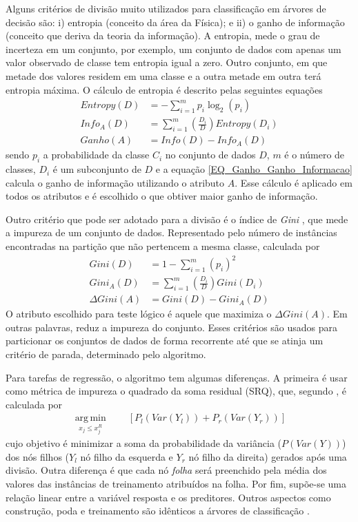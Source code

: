 Alguns critérios de divisão muito utilizados para classificação em árvores de decisão são: i) entropia (conceito da área da Física); e ii) o ganho de informação  (conceito que deriva da teoria da informação). A entropia, mede o grau de incerteza em um conjunto, por exemplo, um conjunto de dados com apenas um valor observado de classe tem entropia igual a zero. Outro conjunto, em que metade dos valores residem em uma classe e a outra metade em outra terá entropia máxima. O cálculo de entropia \cite{HanKamber2011} é descrito pelas seguintes equações
\begin{align}
Entropy(D) &= - \sum\limits_{i=1}^{m}p_{i}\log_{2}(p_{i})\label{EQ_Entropia_Ganho_Informacao} \\
Info_{A}(D) &= \sum\limits_{i=1}^{m}\left(\frac{D_{i}}{D}\right)Entropy(D_{i})\label{EQ_Informacao_AtributoA_Ganho_Informacao}\\
Ganho(A) &= Info(D) - Info_{A}(D)\label{EQ_Ganho_Ganho_Informacao}
\end{align}
sendo \(p_{i}\) a probabilidade da classe \(C_{i}\) no conjunto de dados \(D\), \(m\) é o número de classes, \(D_{i}\) é um subconjunto de \(D\) e a equação \eqref{EQ_Ganho_Ganho_Informacao} calcula o ganho de informação utilizando o atributo \(A\). Esse cálculo é aplicado em todos os atributos e é escolhido o que obtiver maior ganho de informação.

Outro critério que pode ser adotado para a divisão é o índice de \emph{Gini} \cite{HanKamber2011}, que mede a impureza de um conjunto de dados. Representado pelo número de instâncias encontradas na partição que não pertencem a mesma classe, calculada por
\begin{align}
Gini(D) &= 1 - \sum\limits_{i=1}^{m}(p_{i})^{2}\label{EQ_Gini_01} \\
Gini_{A}(D) &= \sum\limits_{i=1}^{m} \left(\frac{D_{i}}{D}\right)Gini(D_{i})\label{EQ_Gini_02} \\
\Delta Gini(A) &= Gini(D) - Gini_{A}(D)\label{EQ_Gini_03}
\end{align}
O atributo escolhido para teste lógico é aquele que maximiza o \(\Delta Gini(A)\).  Em outras palavras, reduz a impureza do conjunto. Esses critérios são usados para particionar os conjuntos de dados de forma recorrente até que se atinja um critério de parada, determinado pelo algoritmo. 

Para tarefas de regressão, o algoritmo tem algumas diferenças. A primeira é usar como métrica de impureza o quadrado da soma residual (SRQ), que, segundo , é calculada por
\begin{align}
\operatorname*{arg\,min}_{x_{j} \leq x_{j}^{R}} \qquad [P_{l}(Var(Y_{l})) + P_{r}(Var(Y_{r}))]
\end{align}
cujo objetivo é minimizar a soma da probabilidade da variância (\(P(Var(Y))\)) dos nós filhos (\(Y_{l}\) nó filho da esquerda e \(Y_{r}\) nó filho da direita) gerados após uma divisão. Outra diferença é que cada nó \emph{folha} será preenchido pela média dos valores das instâncias de treinamento atribuídos na folha. Por fim, supõe-se uma relação linear entre a variável resposta e os preditores. Outros aspectos como construção, poda e treinamento são idênticos a árvores de classificação \cite{Connor2007}.

